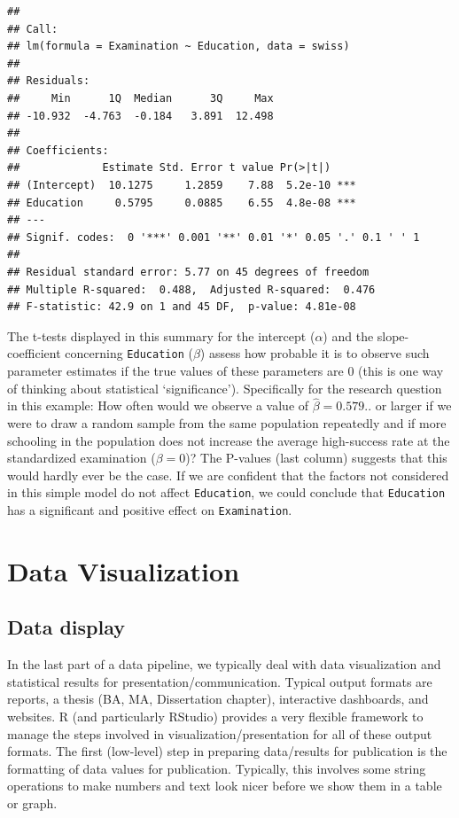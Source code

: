 \documentclass[
  12pt,
]{style/krantz}
\begin{document}
\begin{verbatim}
## 
## Call:
## lm(formula = Examination ~ Education, data = swiss)
## 
## Residuals:
##     Min      1Q  Median      3Q     Max 
## -10.932  -4.763  -0.184   3.891  12.498 
## 
## Coefficients:
##             Estimate Std. Error t value Pr(>|t|)    
## (Intercept)  10.1275     1.2859    7.88  5.2e-10 ***
## Education     0.5795     0.0885    6.55  4.8e-08 ***
## ---
## Signif. codes:  0 '***' 0.001 '**' 0.01 '*' 0.05 '.' 0.1 ' ' 1
## 
## Residual standard error: 5.77 on 45 degrees of freedom
## Multiple R-squared:  0.488,  Adjusted R-squared:  0.476 
## F-statistic: 42.9 on 1 and 45 DF,  p-value: 4.81e-08
\end{verbatim}

The t-tests displayed in this summary for the intercept (\(\alpha\)) and the slope-coefficient concerning \texttt{Education} (\(\beta\)) assess how probable it is to observe such parameter estimates if the true values of these parameters are 0 (this is one way of thinking about statistical `significance'). Specifically for the research question in this example: How often would we observe a value of \(\hat{\beta}=0.579..\) or larger if we were to draw a random sample from the same population repeatedly and if more schooling in the population does not increase the average high-success rate at the standardized examination (\(\beta=0\))? The P-values (last column) suggests that this would hardly ever be the case. If we are confident that the factors not considered in this simple model do not affect \texttt{Education}, we could conclude that \texttt{Education} has a significant and positive effect on \texttt{Examination}.

\hypertarget{data-visualization}{%
\chapter{Data Visualization}\label{data-visualization}}

\hypertarget{data-display}{%
\section{Data display}\label{data-display}}

In the last part of a data pipeline, we typically deal with data visualization and statistical results for presentation/communication. Typical output formats are reports, a thesis (BA, MA, Dissertation chapter), interactive dashboards, and websites. R (and particularly RStudio) provides a very flexible framework to manage the steps involved in visualization/presentation for all of these output formats. The first (low-level) step in preparing data/results for publication is the formatting of data values for publication. Typically, this involves some string operations to make numbers and text look nicer before we show them in a table or graph.
\end{document}
